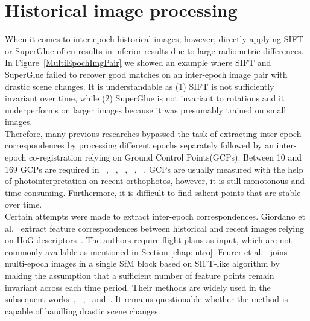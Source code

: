 \section{Historical image processing}
When it comes to inter-epoch historical images, however, directly applying SIFT or SuperGlue often results in inferior results due to large radiometric differences.
In Figure~\ref{MultiEpochImgPair} we showed an example where SIFT and SuperGlue failed to recover good matches on an inter-epoch image pair with drastic scene changes. It is understandable as (1) SIFT is not sufficiently invariant over time, while (2) SuperGlue is not invariant to rotations and it underperforms on larger images because it was presumably trained on small images.\\
Therefore, many previous researches bypassed the task of extracting inter-epoch correspondences by processing different epochs separately followed by an inter-epoch co-registration relying on Ground Control Points(GCPs).
Between 10 and 169 GCPs are required in ~\cite{pinto2019archived}, ~\cite{bozek2019analysis}, ~\cite{persia2020archival}, ~\cite{micheletti2015application}, ~\cite{molg2017structure}.
GCPs are usually measured with the help of photointerpretation on recent orthophotos, however, it is still monotonous and time-consuming. Furthermore, it is difficult to find salient points that are stable over time.\\
Certain attempts were made to extract inter-epoch correspondences. Giordano et al.~\cite{giordano2018toward} extract feature correspondences between historical and recent images relying on HoG descriptors~\cite{dalal2005histograms}. The authors require flight plans as input, which are not commonly available as mentioned in Section \ref{chap:intro}. 
Feurer et al.~\cite{feurer2018joining} joins multi-epoch images in a single SfM block based on SIFT-like algorithm by making the assumption that a sufficient number of feature points remain invariant across each time period. Their methods are widely used in the subsequent works~\cite{filhol2019time}, ~\cite{cook2019simple},~\cite{parente2021automated} and~\cite{blanch2021multi}. It remains questionable whether the method is capable of handling drastic scene changes.
